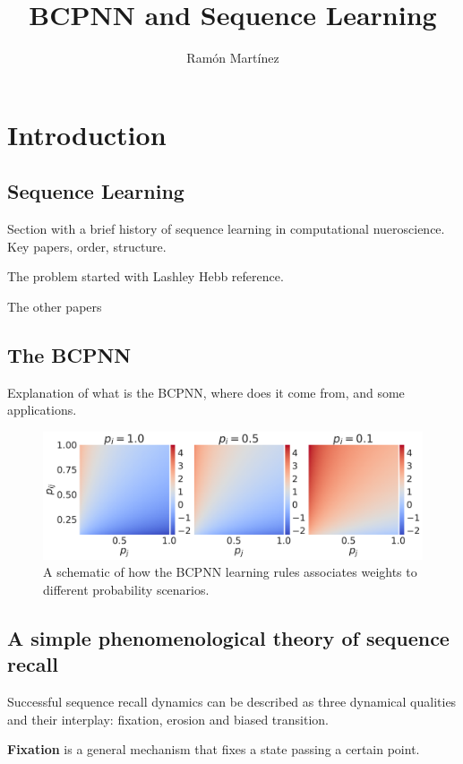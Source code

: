 \documentclass[10pt,a4paper]{article}
\author{Ram\'on Mart\'inez}
\title{BCPNN and Sequence Learning}
\begin{document}
\maketitle

\section{Introduction}

\subsection{Sequence Learning}
Section with a brief history of sequence learning in computational nueroscience. Key papers, order, structure. 


The problem started with Lashley \cite{lashley1951problem} Hebb reference. 

The other papers

\subsection{The BCPNN}
Explanation of what is the BCPNN, where does it come from, and some applications. 

\begin{figure}[H]
\centering
\includegraphics[scale=0.30]{bcpnn_probabiltiies.pdf}
\caption{A schematic of how the BCPNN learning rules associates weights to different probability scenarios.}
\label{fig:bcpnn_probabilities}
\end{figure}



\subsection{A simple phenomenological theory of sequence recall}
Successful sequence recall dynamics can be described as three dynamical qualities and their interplay: fixation, erosion and biased transition. 

\textbf{Fixation} is a general mechanism that fixes a state passing a certain point.
\end{document}
